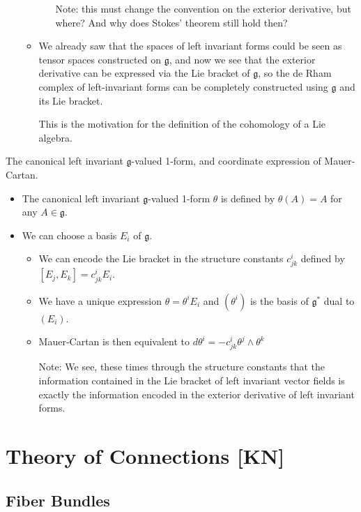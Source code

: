\documentclass{report}
\theoremstyle{definition}
\begin{document}
\begin{itemize}
\begin{itemize}
\begin{itemize}
            Note: this must change the convention on the exterior derivative, but where? And why does Stokes' theorem still hold then?
        \end{itemize}
        \item We already saw that the spaces of left invariant forms could be seen as tensor spaces constructed on $\mathfrak{g}$, and now we see that the exterior derivative can be expressed via the Lie bracket of $\mathfrak{g}$, so the de Rham complex of left-invariant forms can be completely constructed using $\mathfrak{g}$ and its Lie bracket.

        This is the motivation for the definition of the cohomology of a Lie algebra.
    \end{itemize}
\end{itemize}

The canonical left invariant $\mathfrak{g}$-valued 1-form, and coordinate expression of Mauer-Cartan.
\begin{itemize}
    \item The canonical left invariant $\mathfrak{g}$-valued 1-form $\theta$ is defined by $\theta(A)=A$ for any $A\in\mathfrak{g}$.
    \item We can choose a basis $E_i$ of $\mathfrak{g}$.
    \begin{itemize}
        \item We can encode the Lie bracket in the structure constants $c^i_{jk}$ defined by $[E_j,E_k]=c^i_{jk}E_i$.
        \item We have a unique expression $\theta=\theta^iE_i$ and $(\theta^i)$ is the basis of $\mathfrak{g}^*$ dual to $(E_i)$.
        \item Mauer-Cartan is then equivalent to $d\theta^i=-c^i_{jk}\theta^j\wedge\theta^k$

        Note: We see, these times through the structure constants that the information contained in the Lie bracket of left invariant vector fields is exactly the information encoded in the exterior derivative of left invariant forms.
    \end{itemize}
\end{itemize}

\part{Theory of Connections [KN]}

\chapter{Fiber Bundles}
\end{document}
